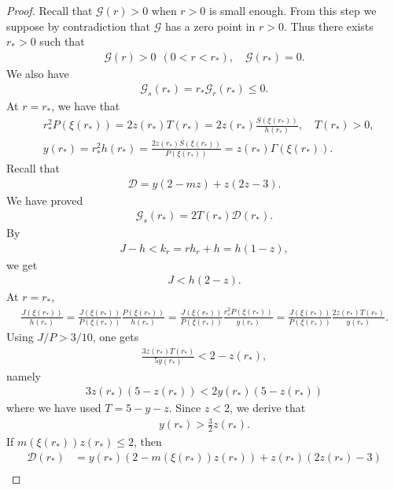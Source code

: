 \documentclass{article}
\theoremstyle{definition} \theoremstyle{remark}
\numberwithin{equation}{section}
\newcommand{\G}{\mathcal{G}}
\begin{document}
\begin{proof}
		\vskip0.12in
 Recall that $\G(r) > 0$ when $r > 0$ is small enough. From this step we suppose by contradiction that $\G$ has a zero point in $r > 0$. Thus there exists $r_* > 0$ such that
		\begin{align*}
			\G(r) > 0 ~~ (0 < r < r_*), \quad \G(r_*) = 0.
		\end{align*}
		We also have
		\begin{align*}
			\G_s(r_*) = r_*\G_r(r_*) \le 0.
		\end{align*}
At $r = r_*$, we have that
		\begin{align}
			& r_*^2P(\xi(r_*)) = 2z(r_*)T(r_*) = 2z(r_*)\frac{S(\xi(r_*))}{h(r_*)}, \quad T(r_*) > 0, \\
			& y(r_*) = r_*^2h(r_*) = \frac{2z(r_*)S(\xi(r_*))}{P(\xi(r_*))} = z(r_*)\Gamma(\xi(r_*)) \label{eqy=zgamma}.
		\end{align}
		Recall that
		\begin{align*}
			\mathcal{D} = y(2 - mz) + z(2z - 3).
		\end{align*}
		We have proved
		\begin{align*}
			\G_s(r_*) = 2T(r_*)\mathcal{D}(r_*).
		\end{align*}
		By
		\begin{align*}
			J - h < k_r = rh_r + h = h(1 - z),
		\end{align*}
		we get
		\begin{align*}
			J < h(2-z).
		\end{align*}
		At $r = r_*$,
		\begin{align*}
			\frac{J(\xi(r_*))}{h(r_*)} = \frac{J(\xi(r_*))}{P(\xi(r_*))}\frac{P(\xi(r_*))}{h(r_*)} = \frac{J(\xi(r_*))}{P(\xi(r_*))}\frac{r_*^2P(\xi(r_*))}{y(r_*)} = \frac{J(\xi(r_*))}{P(\xi(r_*))}\frac{2z(r_*)T(r_*)}{y(r_*)}.
		\end{align*}
		Using $J/P > 3/10$, one gets
		\begin{align*}
			\frac{3z(r_*)T(r_*)}{5y(r_*)} < 2 - z(r_*),
		\end{align*}
		namely
		\begin{align*}
			3z(r_*)(5 - z(r_*)) < 2y(r_*)(5 - z(r_*))
		\end{align*}
		where we have used $T = 5 - y -z$. Since $z < 2$, we derive that
		\begin{align*}
			y(r_*) > \frac{3}{2}z(r_*).
		\end{align*}
		If $m(\xi(r_*))z(r_*) \le 2$, then
		\begin{align*}
			\mathcal{D}(r_*) & = y(r_*)(2 - m(\xi(r_*))z(r_*)) + z(r_*)(2z(r_*) - 3) \\

\end{align*}
\end{proof}
\end{document}
